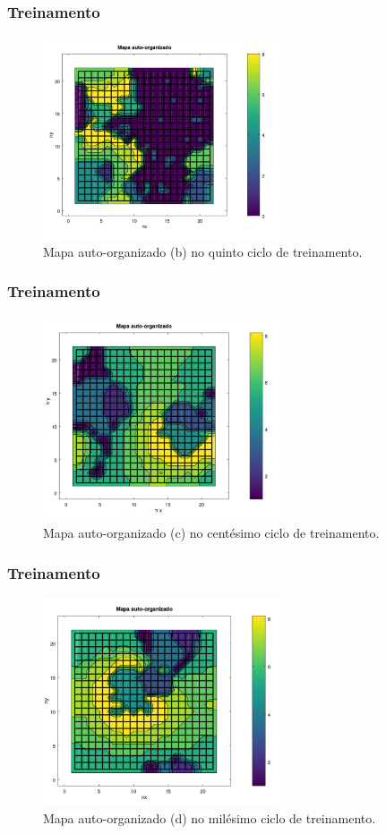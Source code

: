 \documentclass[10pt]{beamer} %
\begin{document}
\begin{frame}
	\frametitle{Treinamento}
	\begin{figure}
		\centering
		\includegraphics[width=7.0cm]{Imagens/SOM5_2d.pdf}
		\caption{Mapa auto-organizado (b) no quinto ciclo de treinamento.}
	\end{figure}
\end{frame}

\begin{frame}
	\frametitle{Treinamento}
	\begin{figure}
		\centering
		\includegraphics[width=7.0cm]{Imagens/SOM100_2d.pdf}
		\caption{Mapa auto-organizado (c) no centésimo ciclo de treinamento.}
	\end{figure}
\end{frame}

\begin{frame}
	\frametitle{Treinamento}
	\begin{figure}
		\centering
		\includegraphics[width=7.0cm]{Imagens/SOM1000_2d.pdf}
		\caption{Mapa auto-organizado (d) no milésimo ciclo de treinamento.}
		\label{SOMd}
	\end{figure}
\end{frame}
\end{document}
